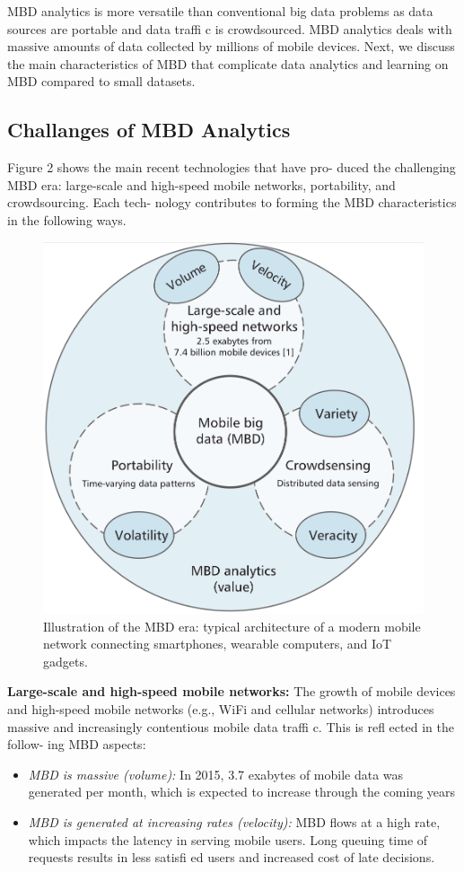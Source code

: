 \documentclass[14pt, a4paper]{extarticle}
\begin{document}
MBD analytics is more versatile than conventional big
data problems as data sources are portable and data traffi c is
crowdsourced. MBD analytics deals with massive amounts of
data collected by millions of mobile devices. Next, we discuss
the main characteristics of MBD that complicate data analytics
and learning on MBD compared to small datasets.

\subsection{Challanges of MBD Analytics}

Figure 2 shows the main recent technologies that have pro-
duced the challenging MBD era: large-scale and high-speed
mobile networks, portability, and crowdsourcing. Each tech-
nology contributes to forming the MBD characteristics in the
following ways.

\begin{figure}[!h]
	\centering
    \includegraphics[width=.8\linewidth]{mbd_structure.png}
    \caption{Illustration of the MBD era: typical architecture of a modern mobile network connecting smartphones, wearable
computers, and IoT gadgets.}
\end{figure}


\textbf{Large-scale and high-speed mobile networks: }The growth
of mobile devices and high-speed mobile networks (e.g., WiFi
and cellular networks) introduces massive and increasingly
contentious mobile data traffi c. This is refl ected in the follow-
ing MBD aspects:

\begin{itemize}
\item {\textit{MBD is massive (volume):} In 2015, 3.7 exabytes of mobile
data was generated per month, which is expected to increase
through the coming years }

\item{\textit{MBD is generated at increasing rates (velocity): }MBD flows
at a high rate, which impacts the latency in serving mobile
users. Long queuing time of requests results in less satisfi ed
users and increased cost of late decisions.}

\end{itemize}
\end{document}
